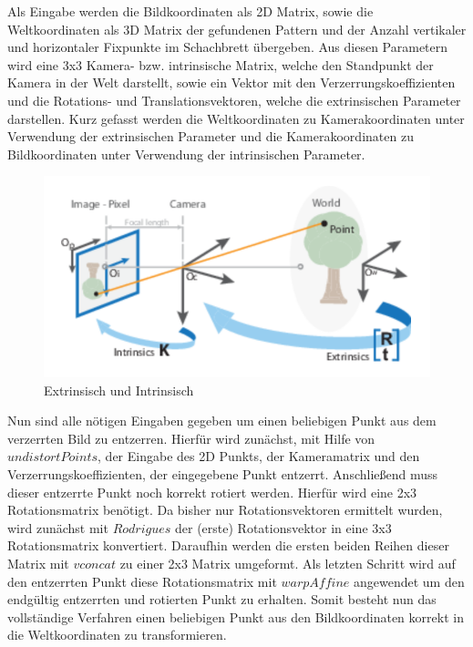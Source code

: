 Als Eingabe werden die Bildkoordinaten als 2D Matrix, sowie die Weltkoordinaten als 3D Matrix der gefundenen Pattern und der Anzahl vertikaler und horizontaler Fixpunkte im Schachbrett übergeben. Aus diesen Parametern wird eine 3x3 Kamera- bzw. intrinsische Matrix, welche den Standpunkt der Kamera in der Welt darstellt, sowie ein Vektor mit den Verzerrungskoeffizienten und die Rotations- und Translationsvektoren, welche die extrinsischen Parameter darstellen. Kurz gefasst werden die Weltkoordinaten zu Kamerakoordinaten unter Verwendung der extrinsischen Parameter und die Kamerakoordinaten zu Bildkoordinaten unter Verwendung der intrinsischen Parameter.
\begin{figure}[h]
	\centering
	\includegraphics[scale=1.3]{bilder/extrinIntrin.png}
	\caption{Extrinsisch und Intrinsisch}
\end{figure}
Nun sind alle nötigen Eingaben gegeben um einen beliebigen Punkt aus dem verzerrten Bild zu entzerren. Hierfür wird zunächst, mit Hilfe von $undistortPoints$, der Eingabe des 2D Punkts, der Kameramatrix und den Verzerrungskoeffizienten, der eingegebene Punkt entzerrt. Anschließend muss dieser entzerrte Punkt noch korrekt rotiert werden. Hierfür wird eine 2x3 Rotationsmatrix benötigt. Da bisher nur Rotationsvektoren ermittelt wurden, wird zunächst mit $Rodrigues$ der (erste) Rotationsvektor in eine 3x3 Rotationsmatrix konvertiert. Daraufhin werden die ersten beiden Reihen dieser Matrix mit $vconcat$ zu einer 2x3 Matrix umgeformt. Als letzten Schritt wird auf den entzerrten Punkt diese Rotationsmatrix mit $warpAffine$ angewendet um den endgültig entzerrten und rotierten Punkt zu erhalten. Somit besteht nun das vollständige Verfahren einen beliebigen Punkt aus den Bildkoordinaten korrekt in die Weltkoordinaten zu transformieren.

